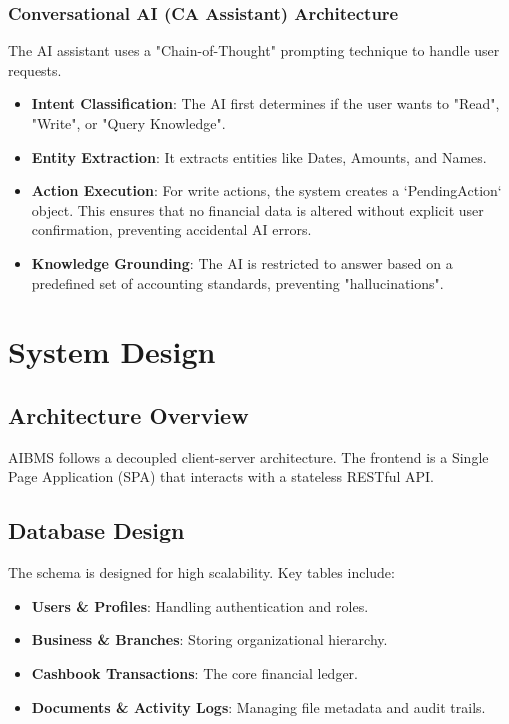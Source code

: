 \documentclass[12pt,a4paper]{report}
\begin{document}
\subsection{Conversational AI (CA Assistant) Architecture}
The AI assistant uses a "Chain-of-Thought" prompting technique to handle user requests.
\begin{itemize}
    \item \textbf{Intent Classification}: The AI first determines if the user wants to "Read", "Write", or "Query Knowledge".
    \item \textbf{Entity Extraction}: It extracts entities like Dates, Amounts, and Names.
    \item \textbf{Action Execution}: For write actions, the system creates a `PendingAction` object. This ensures that no financial data is altered without explicit user confirmation, preventing accidental AI errors.
    \item \textbf{Knowledge Grounding}: The AI is restricted to answer based on a predefined set of accounting standards, preventing "hallucinations".
\end{itemize}

\chapter{System Design}
\section{Architecture Overview}
AIBMS follows a decoupled client-server architecture. The frontend is a Single Page Application (SPA) that interacts with a stateless RESTful API.

\section{Database Design}
The schema is designed for high scalability. Key tables include:
\begin{itemize}
    \item \textbf{Users \& Profiles}: Handling authentication and roles.
    \item \textbf{Business \& Branches}: Storing organizational hierarchy.
    \item \textbf{Cashbook Transactions}: The core financial ledger.
    \item \textbf{Documents \& Activity Logs}: Managing file metadata and audit trails.
\end{itemize}
\end{document}
